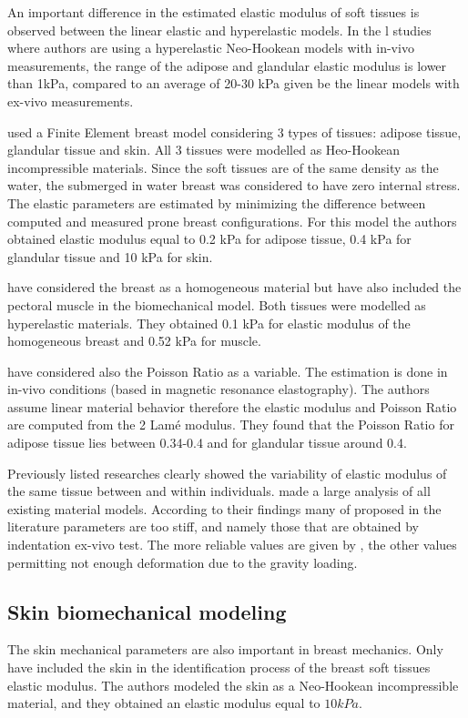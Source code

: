 An important difference in the estimated elastic modulus of soft tissues is observed between the linear elastic and hyperelastic models. In the l studies where authors are using a hyperelastic Neo-Hookean models with in-vivo measurements, the range of the adipose and glandular elastic modulus is lower than 1kPa, compared to an average of 20-30 kPa given be the linear models with ex-vivo measurements. 

\cite{carter_determining_2009} used a Finite Element breast model considering 3 types of tissues: adipose tissue, glandular tissue and skin. All 3 tissues were modelled as Heo-Hookean incompressible materials. Since the soft tissues are of the same density as the water, the submerged in water breast was considered to have zero internal stress.  The elastic parameters are estimated by minimizing the difference between computed and measured prone breast configurations. For this model the authors obtained elastic modulus equal to 0.2 kPa for adipose tissue, 0.4 kPa for glandular tissue and 10 kPa for skin.

 \cite{gamage_modelling_2012} have considered the breast as a homogeneous material but have also included the pectoral muscle in the biomechanical model. Both tissues were modelled as hyperelastic materials. They obtained 0.1 kPa for elastic modulus of the homogeneous breast and 0.52 kPa for muscle. 
  
 \cite{van_houten_initial_2003} have considered also the Poisson Ratio as a variable. The estimation is done in in-vivo conditions (based in magnetic resonance elastography). The authors assume linear material behavior therefore the elastic modulus and Poisson Ratio are computed from the 2 Lam\'e modulus. They found that the Poisson Ratio for adipose tissue lies between 0.34-0.4 and for glandular tissue around 0.4.

Previously listed researches clearly showed the variability of elastic modulus of the same tissue between and within individuals. \cite{eder_comparison_2014} made a large analysis of all existing material models. According to their findings many of proposed in the literature parameters are too stiff, and namely those that are obtained by indentation ex-vivo test. The more reliable values are given by \cite{Rajagopal_creating_2008}, the other values permitting not enough deformation due to the gravity loading.
\subsection{Skin biomechanical modeling}
The skin mechanical parameters are also important in breast mechanics. Only \cite{carter_determining_2009} have included the skin in the identification process of the breast soft tissues elastic modulus. The authors modeled the skin as a Neo-Hookean incompressible material, and they obtained an elastic modulus equal to $10kPa$. 

